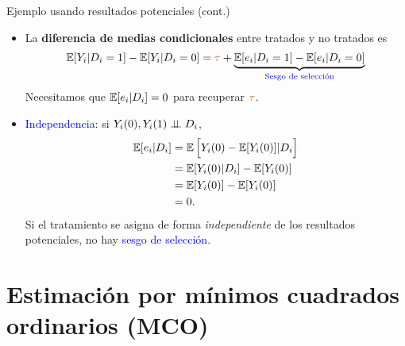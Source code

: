 \documentclass[9pt, xcolor=dvipsnames]{beamer}
\begin{document}
\begin{frame}{Ejemplo usando resultados potenciales (cont.)}
\begin{itemize}
     \item La \textbf{diferencia de medias condicionales} entre tratados y no tratados es
    \begin{align*}
   	\operatorname{\mathbb{E}}[Y_i|D_i=1]-\operatorname{\mathbb{E}}[Y_i|D_i=0] = \textcolor{brown}{\tau} + \underbrace{\operatorname{\mathbb{E}}[e_i|D_i=1]-  \operatorname{\mathbb{E}}[e_i|D_i=0]}_{\textcolor{blue}{\text{Sesgo de selección}}}
    \end{align*}    
        Necesitamos que $\operatorname{\mathbb{E}}[e_i|D_i]=0$ para recuperar \(\textcolor{brown}{\tau}\).
        \vspace{1em}
        \item \textcolor{blue}{Independencia}: si \(Y_i(0), Y_i(1) \perp \!\!\! \perp D_i \),
        \begin{align*}      
        \begin{split}            
            \operatorname{\mathbb{E}}[e_i|D_i] &= \operatorname{\mathbb{E}}\Big[Y_i(0) - \operatorname{\mathbb{E}}[Y_i(0)] \vert D_i \Big] \\
                                &= \operatorname{\mathbb{E}}[Y_i(0)\vert D_i] - \operatorname{\mathbb{E}}[Y_i(0)] \\
                                &= \operatorname{\mathbb{E}}[Y_i(0)] - \operatorname{\mathbb{E}}[Y_i(0)] \\ 
                                &= 0.
        \end{split}
        \end{align*}
        Si el tratamiento se asigna de forma \textit{independiente} de los resultados potenciales, no hay \textcolor{blue}{sesgo de selección}.
\end{itemize}
\end{frame}

\section{Estimación por mínimos cuadrados ordinarios (MCO)}
\end{document}
